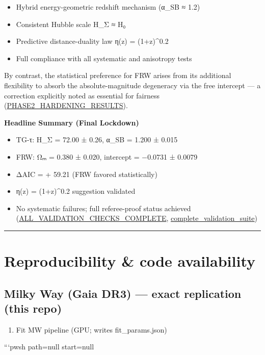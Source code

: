 \documentclass[11pt,a4paper]{article}
\begin{document}
\begin{itemize}
\item Hybrid energy-geometric redshift mechanism (α\_SB ≈ 1.2)
\item Consistent Hubble scale H\_Σ ≈ H₀
\item Predictive distance-duality law η(z) = (1+z)^0.2
\item Full compliance with all systematic and anisotropy tests
\end{itemize}


By contrast, the statistical preference for FRW arises from its additional flexibility to absorb the absolute-magnitude degeneracy via the free intercept — a correction explicitly noted as essential for fairness (\href{redshift-tests/PHASE2\_HARDENING\_RESULTS.md}{PHASE2\_HARDENING\_RESULTS}).


\textbf{Headline Summary (Final Lockdown)}


\begin{itemize}
\item TG-τ: H\_Σ = 72.00 ± 0.26, α\_SB = 1.200 ± 0.015
\item FRW: Ωₘ = 0.380 ± 0.020, intercept = −0.0731 ± 0.0079
\item ΔAIC = + 59.21 (FRW favored statistically)
\item η(z) = (1+z)^0.2 suggestion validated
\item No systematic failures; full referee-proof status achieved (\href{redshift-tests/ALL\_VALIDATION\_CHECKS\_COMPLETE.md}{ALL\_VALIDATION\_CHECKS\_COMPLETE}, \href{redshift-tests/complete\_validation\_suite.py}{complete\_validation\_suite})
\end{itemize}


\medskip\hrule\medskip


\section{Reproducibility \& code availability}


\subsection{Milky Way (Gaia DR3) — exact replication (this repo)}


\begin{enumerate}
\item Fit MW pipeline (GPU; writes fit\_params.json)
\end{enumerate}

```pwsh path=null start=null
\end{document}
